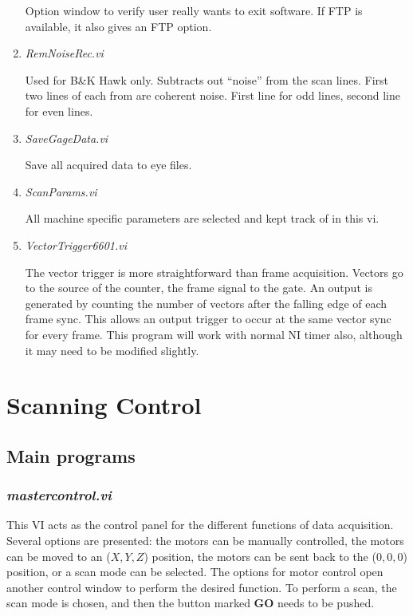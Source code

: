 \documentclass[10pt]{article}
\begin{document}
\begin{enumerate}
Option window to verify user really wants to exit software. If FTP
is available, it also gives an FTP option.

\item {\it RemNoiseRec.vi}

Used for B\&K Hawk only. Subtracts out ``noise'' from the scan
lines. First two lines of each from are coherent noise. First line
for odd lines, second line for even lines.

\item {\it SaveGageData.vi}

Save all acquired data to eye files.

\item {\it ScanParams.vi}

All machine specific parameters are selected and kept track of in
this vi.

\item {\it VectorTrigger6601.vi}

The vector trigger is more straightforward than frame acquisition.
Vectors go to the source of the counter, the frame signal to the
gate. An output is generated by counting the number of vectors
after the falling edge of each frame sync. This allows an output
trigger to occur at the same vector sync for every frame. This
program will work with normal NI timer also, although it may need
to be modified slightly.

\end{enumerate}




\section{Scanning Control}
\label{scan sec}
\subsection{Main programs}

\subsubsection{{\it mastercontrol.vi}}

This VI acts as the control panel for the different functions of
data acquisition. Several options are presented: the motors can be
manually controlled, the motors can be moved to an ($X,Y,Z$)
position, the motors can be sent back to the ($0,0,0$) position,
or a scan mode can be selected. The options for motor control open
another control window to perform the desired function. To perform
a scan, the scan mode is chosen, and then the button marked {\bf
GO} needs to be pushed.
\end{document}
